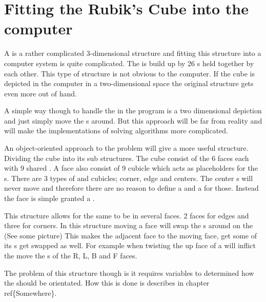 \chapter{Fitting the Rubik's Cube into the computer}
A \rubik{} is a rather complicated 3-dimensional structure and fitting this structure into a computer system is quite complicated. 
The \rubik{} is build up by 26 \cpiece{}s held together by each other. 
This type of structure is not obvious to the computer. If the cube is depicted in the computer in a two-dimensional space the original \rubik{} structure gets even more out of hand. 

A simple way though to handle the \rubik{} in the program is a two dimensional depiction and  just simply move the \facelet{}s around.
But this approach will be far from reality and will make the implementations of solving algorithms more complicated.

An object-oriented approach to the problem will give a more useful structure. 
Dividing the cube into its sub structures. 
The cube consist of the 6 faces each with 9 shared \cpiece{}. 
A face also consist of 9 cubicle which acts as placeholders for the \cpiece{}s. 
There are 3 types of \cpiece{} and cubicles; corner, edge and centers. 
The center \cpiece{}s will never move and therefore there are no reason to define a \cubicle{} and a \cpiece{} for those. Instead the face is simple granted a \facelet{}.

This structure allows for the same \cubicle{} to be in several faces. 
2 faces for edges and three for corners. 
In this structure moving a face will swap the \cpiece{}s around on the \cubicle{}(See some picture) This makes the adjacent face to the moving face, get some of its \cpiece{}s get swapped as well. 
For example when twisting the up face of a \rubik{} will inflict the move the \cpiece{}s of the R, L, B and F faces. 

The problem of this structure though is it requires variables to determined how the \facelet{} should be orientated. 
How this is done is describes in chapter ref\{Somewhere\}.
